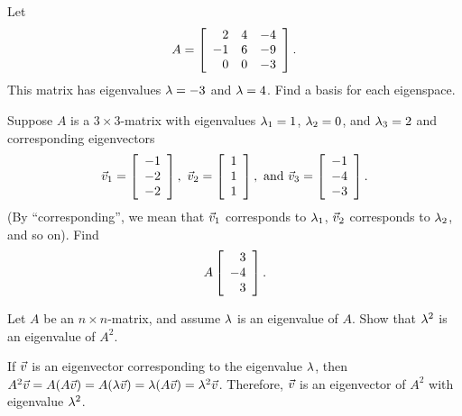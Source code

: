 \documentclass{ximera}
\begin{document}
\begin{exercise}
  Let
  \begin{equation*}
    A = \startmat{rrr}
      2 &   4 &  -4 \\
      -1 &  6 &  -9 \\
      0 &   0 &  -3 \\
    \stopmat.
  \end{equation*}
  This matrix has eigenvalues $\eigenvar=-3$ and $\eigenvar=4$. Find a
  basis for each eigenspace.
\end{exercise}

\begin{exercise}
  Suppose $A$ is a $3\times 3$-matrix with eigenvalues
  $\eigenvar_1=1$, $\eigenvar_2=0$, and $\eigenvar_3=2$ and
  corresponding eigenvectors
  \begin{equation*}
    \vect{v}_1 = \startmat{r}
      -1 \\
      -2 \\
      -2
    \stopmat,
    \quad
    \vect{v}_2 = \startmat{r}
      1 \\
      1 \\
      1
    \stopmat,
    \quad\mbox{and}\quad
    \vect{v}_3 = \startmat{r}
      -1 \\
      -4 \\
      -3
    \stopmat.
  \end{equation*}
  (By ``corresponding'', we mean that $\vect{v}_1$ corresponds to
  $\eigenvar_1$, $\vect{v}_2$ corresponds to $\eigenvar_2$, and so
  on).  Find
  \begin{equation*}
    A\startmat{r}
      3 \\
      -4 \\
      3
    \stopmat.
  \end{equation*}
\end{exercise}

\begin{exercise}
  Let $A$ be an $n\times n$-matrix, and assume $\eigenvar$ is an
  eigenvalue of $A$. Show that $\eigenvar^2$ is an eigenvalue of
  $A^2$.
  \begin{solution}
    If $\vect{v}$ is an eigenvector corresponding to the eigenvalue
    $\eigenvar$, then $A^2\vect{v}=A(A\vect{v}) =
    A(\eigenvar\vect{v}) = \eigenvar(A\vect{v}) =
    \eigenvar^2\vect{v}$. Therefore, $\vect{v}$ is an eigenvector of
    $A^2$ with eigenvalue $\eigenvar^2$.
  \end{solution}
\end{exercise}
\end{document}
